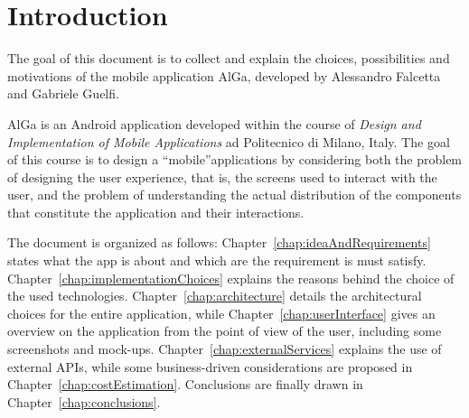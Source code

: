 \chapter{Introduction}
\label{chap:introduction}
The goal of this document is to collect and explain the choices, possibilities and motivations of the mobile application AlGa, developed by Alessandro Falcetta and Gabriele Guelfi.

AlGa is an Android application developed within the course of \textit{Design and Implementation of Mobile Applications} ad Politecnico di Milano, Italy. The goal of this course is to design a ``mobile''applications by considering both the problem of designing the user experience, that is, the screens used to interact with the user, and the problem of understanding the actual distribution of the components that constitute the application and their interactions.

The document is organized as follows: Chapter~\ref{chap:ideaAndRequirements} states what the app is about and which are the requirement is must satisfy. Chapter~\ref{chap:implementationChoices} explains the reasons behind the choice of the used technologies. Chapter~\ref{chap:architecture} details the architectural choices for the entire application, while Chapter~\ref{chap:userInterface} gives an overview on the application from the point of view of the user, including some screenshots and mock-ups. Chapter~\ref{chap:externalServices} explains the use of external APIs, while some business-driven considerations are proposed in Chapter~\ref{chap:costEstimation}. Conclusions are finally drawn in Chapter~\ref{chap:conclusions}.
